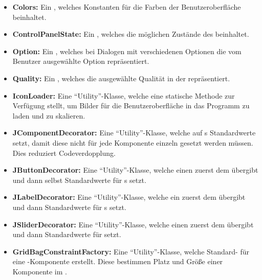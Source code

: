 \begin{itemize}
	\item \textbf{Colors:}
Ein , welches Konstanten für die Farben der Benutzeroberfläche beinhaltet.

	\item \textbf{ControlPanelState:} Ein , welches die möglichen Zustände des  beinhaltet.

	\item \textbf{Option:} Ein , welches bei Dialogen mit verschiedenen Optionen die vom Benutzer ausgewählte Option repräsentiert.

	\item \textbf{Quality:} Ein , welches die ausgewählte Qualität in der  repräsentiert.

	\item \textbf{IconLoader:} Eine \enquote{Utility}-Klasse, welche eine statische Methode zur Verfügung stellt, um Bilder für die Benutzeroberfläche in das Programm zu laden und zu skalieren.

	\item \textbf{JComponentDecorator:} Eine \enquote{Utility}-Klasse, welche auf s Standardwerte setzt, damit diese nicht für jede Komponente einzeln gesetzt werden müssen. Dies reduziert Codeverdopplung.

	\item \textbf{JButtonDecorator:} Eine \enquote{Utility}-Klasse, welche einen  zuerst dem  übergibt und dann selbst Standardwerte für s setzt.

	\item \textbf{JLabelDecorator:} Eine \enquote{Utility}-Klasse, welche ein  zuerst dem  übergibt und dann Standardwerte für s setzt.

	\item \textbf{JSliderDecorator:} Eine \enquote{Utility}-Klasse, welche einen  zuerst dem  übergibt und dann Standardwerte für  setzt.

	\item \textbf{GridBagConstraintFactory:} Eine \enquote{Utility}-Klasse, welche Standard- für eine -Komponente erstellt. Diese bestimmen Platz und Größe einer Komponente im .

\end{itemize}

